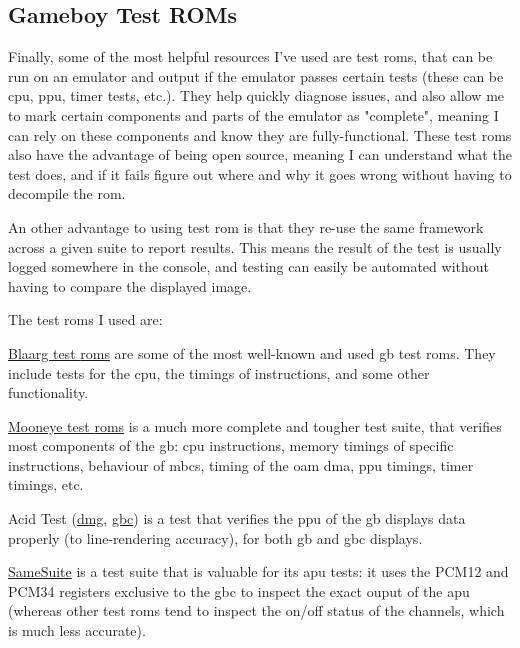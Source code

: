 \documentclass[11pt]{report}
\begin{document}
\subsection{Gameboy Test ROMs}
\label{sec:gb-test-roms}

Finally, some of the most helpful resources I've used are test \glspl{rom}, that can be run on an emulator and output if the emulator passes certain tests (these can be \gls{cpu}, \gls{ppu}, timer tests, etc.). They help quickly diagnose issues, and also allow me to mark certain components and parts of the emulator as "complete", meaning I can rely on these components and know they are fully-functional. These test \glspl{rom} also have the advantage of being open source, meaning I can understand what the test does, and if it fails figure out where and why it goes wrong without having to decompile the \gls{rom}.

An other advantage to using test \gls{rom} is that they re-use the same framework across a given suite to report results. This means the result of the test is usually logged somewhere in the console, and testing can easily be automated without having to compare the displayed image.

The test \glspl{rom} I used are:

\begin{compactitem}
    \item \href{https://github.com/retrio/gb-test-roms/}{Blaarg test \glspl{rom}} are some of the most well-known and used \gls{gb} test \glspl{rom}. They include tests for the \gls{cpu}, the timings of instructions, and some other functionality.
    \item \href{https://github.com/Gekkio/mooneye-test-suite}{Mooneye test \glspl{rom}} is a much more complete and tougher test suite, that verifies most components of the \gls{gb}: \gls{cpu} instructions, memory timings of specific instructions, behaviour of \glspl{mbc}, timing of the \gls{oam} \gls{dma}, \gls{ppu} timings, timer timings, etc.
    \item Acid Test (\href{https://github.com/mattcurrie/dmg-acid2}{\gls{dmg}}, \href{https://github.com/mattcurrie/cgb-acid2}{\gls{gbc}}) is a test that verifies the \gls{ppu} of the \gls{gb} displays data properly (to line-rendering accuracy), for both \glsdesc{gb} and \glsdesc{gbc} displays.
    \item \href{https://github.com/LIJI32/SameSuite/}{SameSuite} is a test suite that is valuable for its \gls{apu} tests: it uses the PCM12 and PCM34 registers exclusive to the \gls{gbc} to inspect the exact ouput of the \gls{apu} (whereas other test \glspl{rom} tend to inspect the on/off status of the channels, which is much less accurate).
\end{compactitem}
\end{document}
